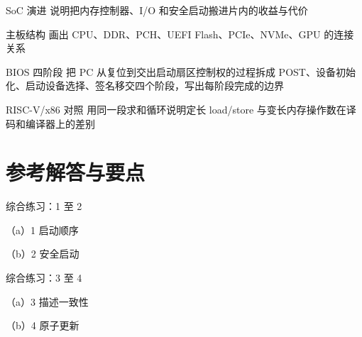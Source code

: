 \begin{chapterexercise}{SoC 演进}
说明把内存控制器、I/O 和安全启动搬进片内的收益与代价
\end{chapterexercise}

\begin{chapterexercise}{主板结构}
画出 CPU、DDR、PCH、UEFI Flash、PCIe、NVMe、GPU 的连接关系
\end{chapterexercise}

\begin{chapterexercise}{BIOS 四阶段}
把 PC 从复位到交出启动扇区控制权的过程拆成 POST、设备初始化、启动设备选择、签名移交四个阶段，写出每阶段完成的边界
\end{chapterexercise}

\begin{chapterexercise}{RISC-V/x86 对照}
用同一段求和循环说明定长 load/store 与变长内存操作数在译码和编译器上的差别
\end{chapterexercise}

\section*{参考解答与要点}

\begin{chapteranswer}{综合练习：1 至 2}
\begin{answersubproblem}{（a）1}
启动顺序
\end{answersubproblem}
\begin{answersubproblem}{（b）2}
安全启动
\end{answersubproblem}
\end{chapteranswer}

\begin{chapteranswer}{综合练习：3 至 4}
\begin{answersubproblem}{（a）3}
描述一致性
\end{answersubproblem}
\begin{answersubproblem}{（b）4}
原子更新
\end{answersubproblem}
\end{chapteranswer}

